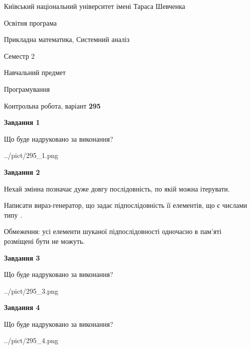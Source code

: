 \documentclass[12pt, ukrainian]{article}
\begin{document}
{{\begin {small}\par
{ \center  Київський національний університет імені Тараса Шевченка \par}
{\parbox {5 cm}{Освітня програма \hfill}{\parbox {8 cm}{Прикладна математика, Системний аналіз \hfill}}\parbox {5 cm}{\hfill Семестр 2}}\par
{\parbox {5 cm} {Навчальний предмет \hfill}\parbox {7 cm}{Програмування \hfill}\parbox {6cm}{\hfill}\par}\vspace{-7pt} \end{small}}{\center Контрольна робота, варіант  \No \textbf
{ 295 }\par}}
{
\begin {large}
{\begin {center}\textbf{Завдання 1}\end {center}}\par
Що буде надруковано за виконання?\par\par
\begin{center}
	{../pict/295_1.png}
\end{center}
\newpage

{\begin {center}\textbf{Завдання 2}\end {center}}\par
Нехай змінна  позначає дуже довгу послідовність, по якій можна ітерувати.

Написати вираз-генератор, що задає підпослідовність її елементів, що є числами типу .

Обмеження: усі елементи шуканої підпослідовності одночасно в пам'яті розміщені бути не можуть.\par
\newpage

{\begin {center}\textbf{Завдання 3}\end {center}}\par
Що буде надруковано за виконання?\par
\begin{center}
	{../pict/295_3.png}
\end{center}
\newpage

{\begin {center}\textbf{Завдання 4}\end {center}}\par
Що буде надруковано за виконання?\par
\begin{center}
	{../pict/295_4.png}
\end{center}
\newpage


\end{large}}
\end{document}
